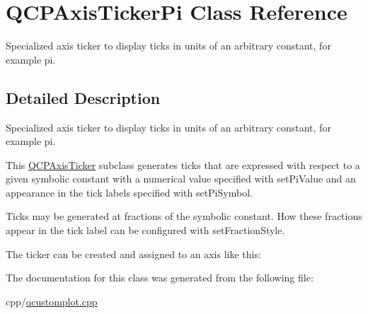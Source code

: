 \hypertarget{class_q_c_p_axis_ticker_pi}{}\section{Q\+C\+P\+Axis\+Ticker\+Pi Class Reference}
\label{class_q_c_p_axis_ticker_pi}


Specialized axis ticker to display ticks in units of an arbitrary constant, for example pi.  




\subsection{Detailed Description}
Specialized axis ticker to display ticks in units of an arbitrary constant, for example pi. 



This \mbox{\hyperlink{class_q_c_p_axis_ticker}{Q\+C\+P\+Axis\+Ticker}} subclass generates ticks that are expressed with respect to a given symbolic constant with a numerical value specified with set\+Pi\+Value and an appearance in the tick labels specified with set\+Pi\+Symbol.

Ticks may be generated at fractions of the symbolic constant. How these fractions appear in the tick label can be configured with set\+Fraction\+Style.

The ticker can be created and assigned to an axis like this\+: 
\begin{DoxyCodeInclude}
\end{DoxyCodeInclude}


The documentation for this class was generated from the following file\+:\begin{DoxyCompactItemize}
\item 
cpp/\mbox{\hyperlink{qcustomplot_8cpp}{qcustomplot.\+cpp}}\end{DoxyCompactItemize}
